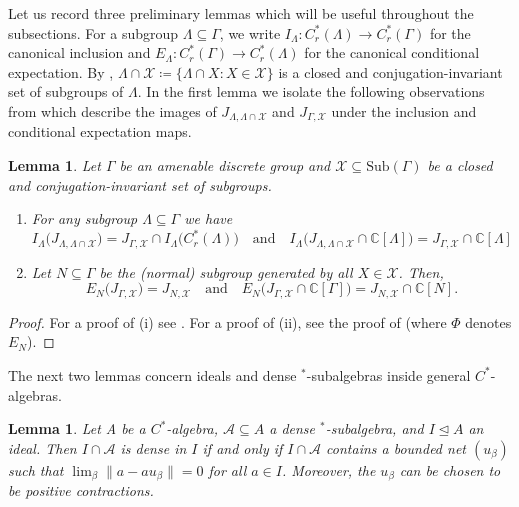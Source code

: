 \documentclass[11pt, oneside, reqno]{amsart}
\newtheorem{lem}[thm]{Lemma}
\theoremstyle{definition}
\theoremstyle{remark}
\numberwithin{equation}{section}
\begin{document}
\vspace{0.3cm}
Let us record three preliminary lemmas which will be useful throughout the subsections. For a subgroup $\Lambda \subseteq \Gamma$, we write $I_\Lambda \colon C^*_r(\Lambda) \to C^*_r(\Gamma)$ for the canonical inclusion and $E_\Lambda \colon C^*_r(\Gamma) \to C^*_r(\Lambda)$ for the canonical conditional expectation.  By \cite[Proposition~7.4]{Hume}, $\Lambda\cap\mathcal{X} \coloneq \{\Lambda\cap X \colon X\in\mathcal{X}\}$ is a closed and conjugation-invariant set of subgroups of $\Lambda$. In the first lemma we isolate the following observations from \cite[Propositions~7.4 \& 7.7]{Hume} which describe the images of $J_{\Lambda, \Lambda \cap \mathcal{X}}$ and $J_{\Gamma, \mathcal{X}}$ under the inclusion and conditional expectation maps.


\begin{lem}\label{Inclusions}
    Let $\Gamma$ be an amenable discrete group and $\mathcal{X} \subseteq \mathrm{Sub}(\Gamma)$ be a closed and conjugation-invariant set of subgroups.
    \begin{enumerate}[label=(\roman*)]
        \item For any subgroup $\Lambda \subseteq \Gamma$ we have
        \[
        I_{\Lambda} \big(J_{\Lambda, \Lambda \cap \mathcal{X}}\big) = J_{\Gamma, \mathcal{X}}\cap I_{\Lambda}\big(C^{*}_{r}(\Lambda)\big) \quad
        \text{and}
        \quad I_{\Lambda} \big(J_{\Lambda, \Lambda \cap \mathcal{X}} \cap \mathbb{C}[\Lambda] \big) = J_{\Gamma,\mathcal{X}}\cap\mathbb{C}[\Lambda]
        \]
        \item Let $N \subseteq \Gamma$ be the (normal) subgroup generated by all $X\in\mathcal{X}$. Then,
        \[
        E_N \big(J_{\Gamma, \mathcal{X}} \big) = J_{N, \mathcal{X}}\quad 
        \text{and}
        \quad E_{N}\big(J_{\Gamma,\mathcal{X}}\cap\mathbb{C}[\Gamma]\big) = J_{N,\mathcal{X}}\cap\mathbb{C}[N].
        \] 
    \end{enumerate}
\end{lem}

\begin{proof}
    For a proof of (i) see \cite[Proposition~7.4]{Hume}. For a proof of (ii), see the proof of \cite[Proposition~7.7]{Hume} (where $\Phi$ denotes $E_{N}$).
\end{proof}

The next two lemmas concern ideals and dense $^*$-subalgebras inside general $C^*$-algebras.

\begin{lem}\label{ApproxUnit}
    Let A be a $C^*$-algebra, $\mathcal{A} \subseteq A$ a dense $^*$-subalgebra, and $I \trianglelefteq A$ an ideal. Then $I \cap \mathcal{A}$ is dense in $I$ if and only if $I \cap \mathcal{A}$ contains a bounded net $(u_{\beta})$ such that $\lim_{\beta}\|a - au_{\beta}\| = 0$ for all $a\in I$. Moreover, the $u_{\beta}$ can be chosen to be positive contractions.
\end{lem}
\end{document}
